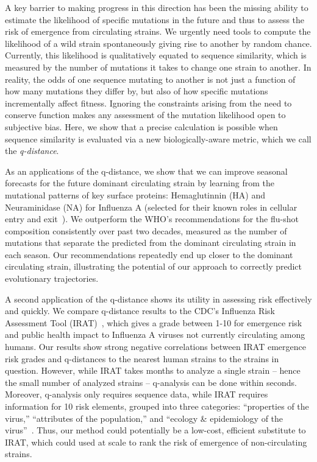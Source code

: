 \documentclass[onecolumn, compsoc,10pt]{IEEEtran}
\begin{document}
A key barrier to making progress in this direction has been the missing ability to estimate the likelihood of specific mutations in the future and thus to assess the risk of emergence from circulating strains. We urgently need tools to compute the likelihood of a wild strain spontaneously giving rise to another by random chance. Currently, this likelihood is qualitatively equated to sequence similarity, which is measured by the number of mutations it takes to change one strain to another. In reality, the odds of one sequence mutating to another is not just a function of how many mutations they differ by, but also of how specific mutations incrementally affect fitness. Ignoring the constraints arising from the need to conserve function makes any assessment of the mutation likelihood open to subjective bias. Here, we show that a precise calculation is possible when sequence similarity is evaluated via a new biologically-aware metric, which we call the \textit{q-distance}.

As an applications of the q-distance, we show that we can improve seasonal forecasts for the future dominant circulating strain by learning from the mutational patterns of key surface proteins: Hemaglutinnin (HA) and Neuraminidase (NA) for Influenza A (selected for their known roles in cellular entry and exit~\cite{gamblin2010influenza}). We outperform the WHO's recommendations for the flu-shot composition consistently over past two decades, measured as the number of mutations that separate the predicted from the dominant circulating strain in each season. Our recommendations repeatedly end up closer to the dominant circulating strain, illustrating the potential of our approach to correctly predict evolutionary trajectories. 

A second application of the q-distance shows its utility in assessing risk effectively and quickly. We compare q-distance results to the CDC's Influenza Risk Assessment Tool (IRAT)~\cite{Influenz24:online}, which gives a grade between 1-10 for emergence risk and public health impact to Influenza A viruses not currently circulating among humans. Our results show strong negative correlations between IRAT emergence risk grades and q-distances to the nearest human strains to the strains in question. However, while IRAT takes months to analyze a single strain -- hence the small number of analyzed strains -- q-analysis can be done within seconds. Moreover, q-analysis only requires sequence data, while IRAT requires information for 10 risk elements, grouped into three categories: “properties of the virus,” “attributes of the population,” and “ecology \& epidemiology of the virus”~\cite{Influenz24:online}. Thus, our method could potentially be a low-cost, efficient substitute to IRAT, which could used at scale to rank the risk of emergence of non-circulating strains.
\end{document}
